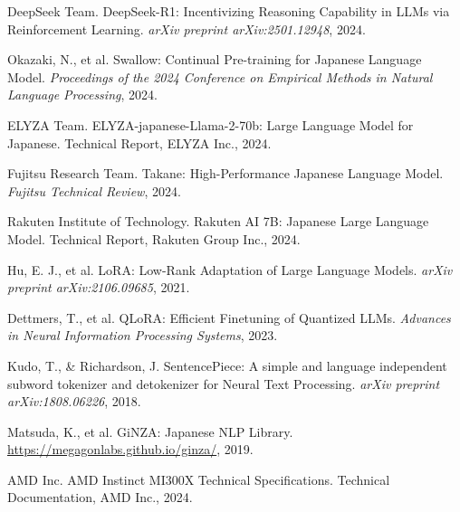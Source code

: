 \documentclass[11pt,a4paper]{article}
\begin{document}

\begin{thebibliography}{99}

DeepSeek Team.
\newblock DeepSeek-R1: Incentivizing Reasoning Capability in LLMs via Reinforcement Learning.
\newblock \textit{arXiv preprint arXiv:2501.12948}, 2024.

Okazaki, N., et al.
\newblock Swallow: Continual Pre-training for Japanese Language Model.
\newblock \textit{Proceedings of the 2024 Conference on Empirical Methods in Natural Language Processing}, 2024.

ELYZA Team.
\newblock ELYZA-japanese-Llama-2-70b: Large Language Model for Japanese.
\newblock Technical Report, ELYZA Inc., 2024.

Fujitsu Research Team.
\newblock Takane: High-Performance Japanese Language Model.
\newblock \textit{Fujitsu Technical Review}, 2024.

Rakuten Institute of Technology.
\newblock Rakuten AI 7B: Japanese Large Language Model.
\newblock Technical Report, Rakuten Group Inc., 2024.

Hu, E. J., et al.
\newblock LoRA: Low-Rank Adaptation of Large Language Models.
\newblock \textit{arXiv preprint arXiv:2106.09685}, 2021.

Dettmers, T., et al.
\newblock QLoRA: Efficient Finetuning of Quantized LLMs.
\newblock \textit{Advances in Neural Information Processing Systems}, 2023.

Kudo, T., \& Richardson, J.
\newblock SentencePiece: A simple and language independent subword tokenizer and detokenizer for Neural Text Processing.
\newblock \textit{arXiv preprint arXiv:1808.06226}, 2018.

Matsuda, K., et al.
\newblock GiNZA: Japanese NLP Library.
\newblock \url{https://megagonlabs.github.io/ginza/}, 2019.

AMD Inc.
\newblock AMD Instinct MI300X Technical Specifications.
\newblock Technical Documentation, AMD Inc., 2024.

\end{thebibliography}
\end{document}
